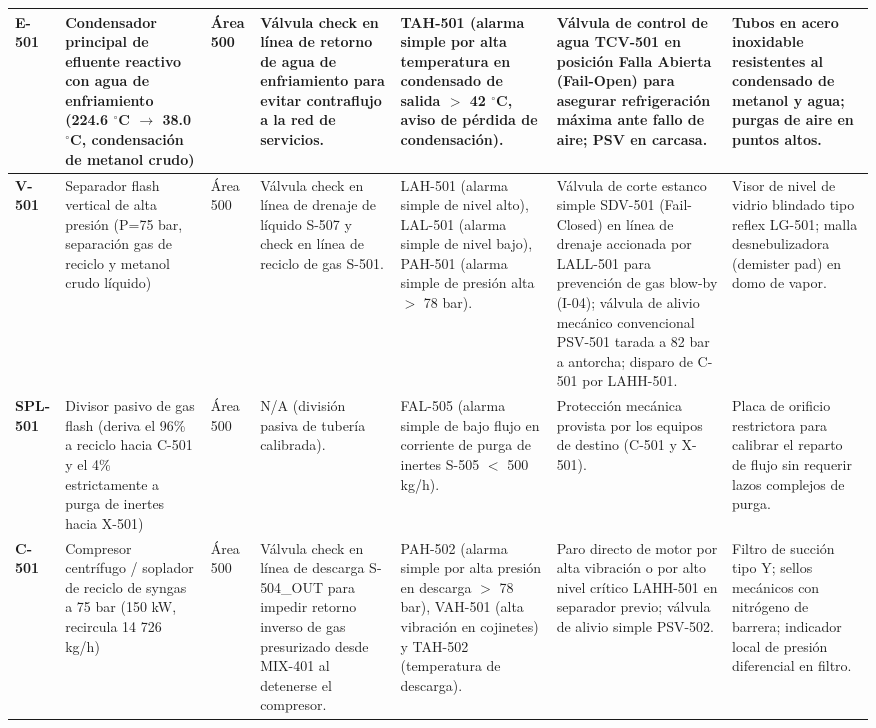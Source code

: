 \documentclass[10pt,letterpaper]{article}
\begin{document}
\begin{landscape}
\begin{xltabular}{\linewidth}{|l|p{2.8cm}|p{1.2cm}|>{\raggedright\arraybackslash}X|>{\raggedright\arraybackslash}X|>{\raggedright\arraybackslash}X|p{2.8cm}|}
\textbf{E-501} & Condensador principal de efluente reactivo con agua de enfriamiento (224.6 $^\circ$C $\to$ 38.0 $^\circ$C, condensación de metanol crudo) & Área 500 & Válvula check en línea de retorno de agua de enfriamiento para evitar contraflujo a la red de servicios. & TAH-501 (alarma simple por alta temperatura en condensado de salida $>$ 42 $^\circ$C, aviso de pérdida de condensación). & Válvula de control de agua TCV-501 en posición Falla Abierta (Fail-Open) para asegurar refrigeración máxima ante fallo de aire; PSV en carcasa. & Tubos en acero inoxidable resistentes al condensado de metanol y agua; purgas de aire en puntos altos. \\ \hline
\textbf{V-501} & Separador flash vertical de alta presión (P=75 bar, separación gas de reciclo y metanol crudo líquido) & Área 500 & Válvula check en línea de drenaje de líquido S-507 y check en línea de reciclo de gas S-501. & LAH-501 (alarma simple de nivel alto), LAL-501 (alarma simple de nivel bajo), PAH-501 (alarma simple de presión alta $>$ 78 bar). & Válvula de corte estanco simple SDV-501 (Fail-Closed) en línea de drenaje accionada por LALL-501 para prevención de gas blow-by (I-04); válvula de alivio mecánico convencional PSV-501 tarada a 82 bar a antorcha; disparo de C-501 por LAHH-501. & Visor de nivel de vidrio blindado tipo reflex LG-501; malla desnebulizadora (demister pad) en domo de vapor. \\ \hline
\textbf{SPL-501} & Divisor pasivo de gas flash (deriva el 96\% a reciclo hacia C-501 y el 4\% estrictamente a purga de inertes hacia X-501) & Área 500 & N/A (división pasiva de tubería calibrada). & FAL-505 (alarma simple de bajo flujo en corriente de purga de inertes S-505 $<$ 500 kg/h). & Protección mecánica provista por los equipos de destino (C-501 y X-501). & Placa de orificio restrictora para calibrar el reparto de flujo sin requerir lazos complejos de purga. \\ \hline
\textbf{C-501} & Compresor centrífugo / soplador de reciclo de syngas a 75 bar (150 kW, recircula 14 726 kg/h) & Área 500 & Válvula check en línea de descarga S-504\_\allowbreak OUT para impedir retorno inverso de gas presurizado desde MIX-401 al detenerse el compresor. & PAH-502 (alarma simple por alta presión en descarga $>$ 78 bar), VAH-501 (alta vibración en cojinetes) y TAH-502 (temperatura de descarga). & Paro directo de motor por alta vibración o por alto nivel crítico LAHH-501 en separador previo; válvula de alivio simple PSV-502. & Filtro de succión tipo Y; sellos mecánicos con nitrógeno de barrera; indicador local de presión diferencial en filtro. \\ \hline

\end{xltabular}
\end{landscape}
\end{document}
